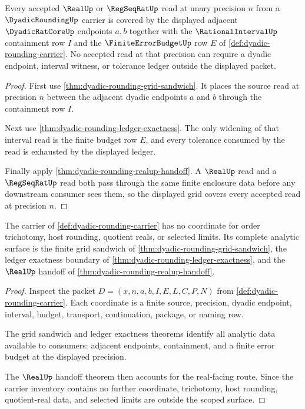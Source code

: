 \begin{theorem}
\label{thm:dyadic-rounding-finite-grid-coverage}
Every accepted $\RealUp$ or $\RegSeqRatUp$ read at unary precision $n$ from a $\DyadicRoundingUp$ carrier is covered by the displayed adjacent $\DyadicRatCoreUp$ endpoints $a,b$ together with the $\RationalIntervalUp$ containment row $I$ and the $\FiniteErrorBudgetUp$ row $E$ of \autoref{def:dyadic-rounding-carrier}. No accepted read at that precision can require a dyadic endpoint, interval witness, or tolerance ledger outside the displayed packet.
\end{theorem}
\begin{proof}
First use \autoref{thm:dyadic-rounding-grid-sandwich}. It places the source read at precision $n$ between the adjacent dyadic endpoints $a$ and $b$ through the containment row $I$.

Next use \autoref{thm:dyadic-rounding-ledger-exactness}. The only widening of that interval read is the finite budget row $E$, and every tolerance consumed by the read is exhausted by the displayed ledger.

Finally apply \autoref{thm:dyadic-rounding-realup-handoff}. A $\RealUp$ read and a $\RegSeqRatUp$ read both pass through the same finite enclosure data before any downstream consumer sees them, so the displayed grid covers every accepted read at precision $n$.
\end{proof}

\begin{theorem}
\label{thm:dyadic-rounding-carrier-scope}
The carrier of \autoref{def:dyadic-rounding-carrier} has no coordinate for order trichotomy, host rounding, quotient reals, or selected limits. Its complete analytic surface is the finite grid sandwich of \autoref{thm:dyadic-rounding-grid-sandwich}, the ledger exactness boundary of \autoref{thm:dyadic-rounding-ledger-exactness}, and the $\RealUp$ handoff of \autoref{thm:dyadic-rounding-realup-handoff}.
\end{theorem}
\begin{proof}
Inspect the packet $D=(x,n,a,b,I,E,L,C,P,N)$ from \autoref{def:dyadic-rounding-carrier}. Each coordinate is a finite source, precision, dyadic endpoint, interval, budget, transport, continuation, package, or naming row.

The grid sandwich and ledger exactness theorems identify all analytic data available to consumers: adjacent endpoints, containment, and a finite error budget at the displayed precision.

The $\RealUp$ handoff theorem then accounts for the real-facing route. Since the carrier inventory contains no further coordinate, trichotomy, host rounding, quotient-real data, and selected limits are outside the scoped surface.
\end{proof}

